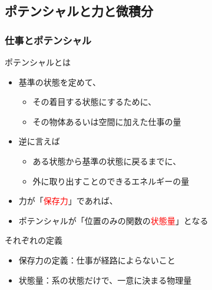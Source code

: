 \documentclass[12pt, dvipdfmx]{beamer}
\begin{document}
\subsection{ポテンシャルと力と微積分}
\begin{frame}
	\frametitle{仕事とポテンシャル}
		\vspace{-2mm}
		\begin{block}{ポテンシャルとは}
			\begin{itemize}
				\item \alert{基準の状態}を定めて、
				\begin{itemize}
					\item その着目する状態にするために、
					\item その物体あるいは空間に加えた\alert{仕事の量}
				\end{itemize}
				\item 逆に言えば
				\begin{itemize}
					\item ある状態から基準の状態に戻るまでに、
					\item \alert{外に取り出すことのできるエネルギーの量}
				\end{itemize}
				\item 力が「\textcolor{red}{保存力}」であれば、
				\item ポテンシャルが「位置のみの関数の\textcolor{red}{状態量}」となる
			\end{itemize}
		\end{block}
		\vspace{-2mm}
		\begin{alertblock}{それぞれの定義}
			\begin{itemize}
				\item 保存力の定義：仕事が経路によらないこと
				\item 状態量：系の状態だけで、一意に決まる物理量
			\end{itemize}
		\end{alertblock}
\end{frame}
\end{document}
